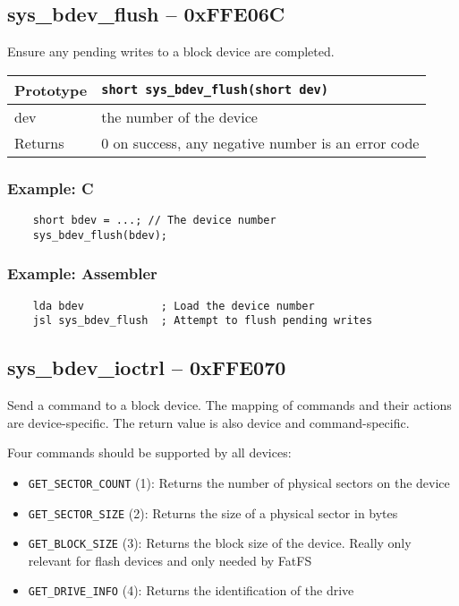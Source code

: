 \subsection*{sys\_bdev\_flush -- 0xFFE06C}
Ensure any pending writes to a block device are completed.

\bigskip

\begin{tabular}{|l||l|} \hline
Prototype & \lstinline!short sys_bdev_flush(short dev)! \\ \hline
dev & the number of the device \\ \hline
Returns & 0 on success, any negative number is an error code \\ \hline
\end{tabular}

\subsubsection*{Example: C}
\begin{lstlisting}
    short bdev = ...; // The device number
    sys_bdev_flush(bdev);
\end{lstlisting}

\subsubsection*{Example: Assembler}
\begin{verbatim}
    lda bdev            ; Load the device number
    jsl sys_bdev_flush  ; Attempt to flush pending writes
\end{verbatim}

\subsection*{sys\_bdev\_ioctrl -- 0xFFE070}
Send a command to a block device. The mapping of commands and their actions are device-specific. The return value is also device and command-specific.

Four commands should be supported by all devices:
\begin{itemize}
    \item \verb+GET_SECTOR_COUNT+ (1): Returns the number of physical sectors on the device
    \item \verb+GET_SECTOR_SIZE+ (2): Returns the size of a physical sector in bytes
    \item \verb+GET_BLOCK_SIZE+ (3): Returns the block size of the device. Really only relevant for flash devices and only needed by FatFS
    \item \verb+GET_DRIVE_INFO+ (4): Returns the identification of the drive
\end{itemize}


